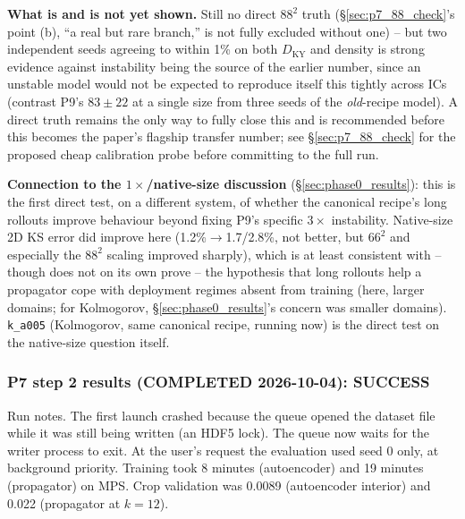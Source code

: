 \documentclass[11pt]{article}
\begin{document}
\textbf{What is and is not yet shown.} Still no direct $88^2$ truth
(\S\ref{sec:p7_88_check}'s point (b), ``a real but rare branch,'' is not
fully excluded without one) -- but two independent seeds agreeing to
within 1\% on both $D_{\mathrm{KY}}$ and density is strong evidence
against instability being the source of the earlier number, since an
unstable model would not be expected to reproduce itself this tightly
across ICs (contrast P9's $83\pm22$ at a single size from three seeds of
the \emph{old}-recipe model). A direct truth remains the only way to
fully close this and is recommended before this becomes the paper's
flagship transfer number; see \S\ref{sec:p7_88_check} for the proposed
cheap calibration probe before committing to the full run.

\textbf{Connection to the $1\times$/native-size discussion}
(\S\ref{sec:phase0_results}): this is the first direct test, on a
different system, of whether the canonical recipe's long rollouts
improve behaviour beyond fixing P9's specific $3\times$ instability.
Native-size 2D KS error did improve here (1.2\%$\to$1.7/2.8\%, not
better, but $66^2$ and especially the $88^2$ scaling improved sharply),
which is at least consistent with -- though does not on its own prove --
the hypothesis that long rollouts help a propagator cope with
deployment regimes absent from training (here, larger domains; for
Kolmogorov, \S\ref{sec:phase0_results}'s concern was smaller domains).
\texttt{k\_a005} (Kolmogorov, same canonical recipe, running now) is the
direct test on the native-size question itself.

\subsubsection{P7 step 2 results (COMPLETED 2026-10-04): SUCCESS}
\label{sec:p7_results}

Run notes. The first launch crashed because the queue opened the
dataset file while it was still being written (an HDF5 lock). The
queue now waits for the writer process to exit. At the user's request
the evaluation used seed 0 only, at background priority. Training took
8 minutes (autoencoder) and 19 minutes (propagator) on MPS. Crop
validation was 0.0089 (autoencoder interior) and 0.022 (propagator at
$k{=}12$).
\end{document}
